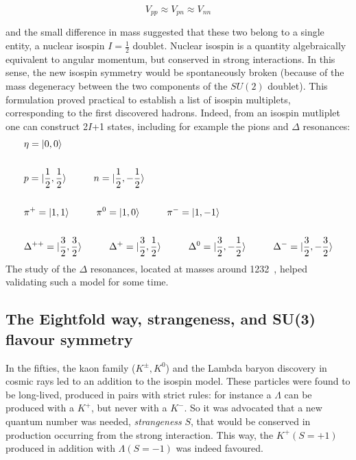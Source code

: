 \begin{equation}
V_{pp} \approx V_{pn} \approx V_{nn}
\end{equation}

and the small difference in mass suggested that these two belong to a
single entity, a nuclear isospin $I=\frac{1}{2}$ doublet. Nuclear
isospin is a quantity algebraically equivalent to angular
momentum, but conserved in strong
interactions. In this sense, the new isospin symmetry would be
spontaneously broken (because of the mass degeneracy between the two
components of the $SU(2)$ doublet). This formulation proved practical to establish a list of
isospin multiplets, corresponding to the first discovered hadrons. 
Indeed, from an isospin mutliplet  one can construct
2$I$+1 states, including for example the pions and
$\Delta$ resonances:
\begin{eqnarray*}
    &\eta = |0,0\rangle \\
    \\
    &p = |\frac{1}{2},\frac{1}{2}\rangle \hspace{1cm} n =
    |\frac{1}{2},-\frac{1}{2}\rangle \\
    \\
    &\pi^{+} = |1,1\rangle \hspace{1cm} \pi^{0} = |1,0\rangle \hspace{1cm}
    \pi^{-}=|1,-1\rangle\\
    \\
    &\Delta^{++}=|\frac{3}{2},\frac{3}{2}\rangle \hspace{1cm} \Delta^{+} =
    |\frac{3}{2},\frac{1}{2}\rangle \hspace{1cm} \Delta^{0} =
    |\frac{3}{2},-\frac{1}{2}\rangle \hspace{1cm} \Delta^{-} =
    |\frac{3}{2},-\frac{3}{2}\rangle  
\end{eqnarray*}
The study of the $\Delta$ resonances, located at masses around 1232~\MeVmass, helped validating such a model for some time.

\subsection{The Eightfold way, strangeness, and SU(3) flavour
  symmetry}
\label{sec:eightfold}
In the fifties, the kaon family ($K^{\pm}, K^0$) and the Lambda baryon discovery in cosmic rays led to an addition to the isospin
model. These particles were found to be long-lived, produced in pairs
with strict rules: for instance a $\Lambda$ can be produced with a $K^{+}$, but never with a $K^{-}$. So it was advocated that a new quantum number was needed,
\textit{strangeness} $S$, that would be conserved in production occurring from the
strong interaction. This way, the $K^{+}(S=+1)$ produced in addition
with $\Lambda(S=-1)$ was indeed favoured.

